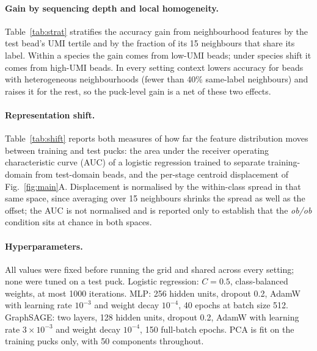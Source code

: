 \paragraph{Gain by sequencing depth and local homogeneity.} Table~\ref{tab:strat} stratifies the accuracy gain from neighbourhood features by the test bead's UMI tertile and by the fraction of its 15 neighbours that share its label. Within a species the gain comes from low-UMI beads; under species shift it comes from high-UMI beads. In every setting context lowers accuracy for beads with heterogeneous neighbourhoods (fewer than 40\% same-label neighbours) and raises it for the rest, so the puck-level gain is a net of these two effects.

\begin{table}[H]
\centering
\caption{Accuracy gain from neighbourhood features (expr+nbr minus expr, LR) stratified by the test bead's UMI tertile within its puck and by its local label homogeneity. Mean over test pucks of each setting.}
\label{tab:strat}
\small

\end{table}

\paragraph{Representation shift.} Table~\ref{tab:shift} reports both measures of how far the feature distribution moves between training and test pucks: the area under the receiver operating characteristic curve (AUC) of a logistic regression trained to separate training-domain from test-domain beads, and the per-stage centroid displacement of Fig.~\ref{fig:main}A. Displacement is normalised by the within-class spread in that same space, since averaging over 15 neighbours shrinks the spread as well as the offset; the AUC is not normalised and is reported only to establish that the \emph{ob/ob} condition sits at chance in both spaces.

\begin{table}[H]
\centering
\caption{Representation shift between training and test pucks. Domain-classifier AUC (0.5 = indistinguishable) and mean per-stage centroid displacement in units of within-class spread, for the bead's own embedding and for the neighbourhood mean.}
\label{tab:shift}
\small

\end{table}

\paragraph{Hyperparameters.} All values were fixed before running the grid and shared across every setting; none were tuned on a test puck. Logistic regression: $C=0.5$, class-balanced weights, at most 1000 iterations. MLP: 256 hidden units, dropout 0.2, AdamW with learning rate $10^{-3}$ and weight decay $10^{-4}$, 40 epochs at batch size 512. GraphSAGE: two layers, 128 hidden units, dropout 0.2, AdamW with learning rate $3\times10^{-3}$ and weight decay $10^{-4}$, 150 full-batch epochs. PCA is fit on the training pucks only, with 50 components throughout.

